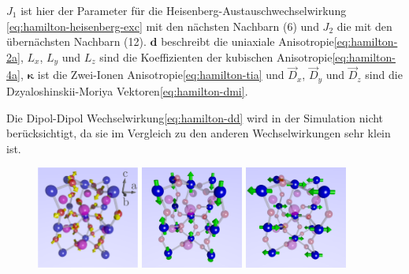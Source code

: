 \documentclass[main.tex]{subfiles}
\begin{document}
\(J_1\) ist hier der Parameter für die Heisenberg-Austauschwechselwirkung \eqref{eq:hamilton-heisenberg-exc} mit den nächsten Nachbarn (6) und \(J_2\) die mit den übernächsten Nachbarn (12). \(\mathbf{d}\) beschreibt die uniaxiale Anisotropie\eqref{eq:hamilton-2a}, \(L_x\), \(L_y\) und \(L_z\) sind die Koeffizienten der kubischen Anisotropie\eqref{eq:hamilton-4a}, \(\mathbf{\kappa}\) ist die Zwei-Ionen Anisotropie\eqref{eq:hamilton-tia} und \(\vec{D}_x\), \(\vec{D}_y\) und \(\vec{D}_z\) sind die Dzyaloshinskii-Moriya Vektoren\eqref{eq:hamilton-dmi}.

Die Dipol-Dipol Wechselwirkung\eqref{eq:hamilton-dd} wird in der Simulation nicht berücksichtigt, da sie im Vergleich zu den anderen Wechselwirkungen sehr klein ist.

\begin{figure}[htbp]
	\centering
	{\includegraphics[width=0.3\textwidth]{bilder/jschlege/UnitCell_withDMI_labeled.png}}
	{\includegraphics[width=0.3\textwidth]{bilder/jschlege/UnitCell_belowRT.png}}
	{\includegraphics[width=0.3\textwidth]{bilder/jschlege/UnitCell_aboveRT.png}}

\end{figure}
\end{document}
